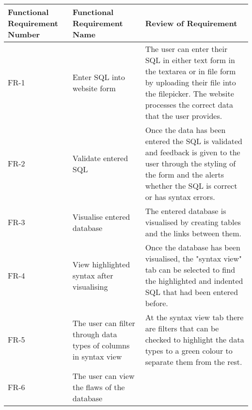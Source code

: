 \begin{center}
	\setlength\extrarowheight{2pt}
	\begin{tabularx}{\textwidth}{|X|X|X|}
		\hline
		\textbf{Functional Requirement Number} & \textbf{Functional Requirement Name} & \textbf{Review of Requirement} \\
		\hline
		FR-1 &  Enter SQL into website form & The user can enter their SQL in either text form in the textarea or in file form by uploading their file into the filepicker. The website processes the correct data that the user provides. \\
		\hline
		FR-2 & Validate entered SQL & Once the data has been entered the SQL is validated and feedback is given to the user through the styling of the form and the alerts whether the SQL is correct or has syntax errors. \\
		\hline
		FR-3 & Visualise entered database & The entered database is visualised by creating tables and the links between them.\\
		\hline
		FR-4 & View highlighted syntax after visualising & Once the database has been visualised, the "syntax view" tab can be selected to find the highlighted and indented SQL that had been entered before. \\
		\hline
		FR-5 & The user can filter through data types of columns in syntax view & At the syntax view tab there are filters that can be checked to highlight the data types to a green colour to separate them from the rest. \\
		\hline
		FR-6 & The user can view the flaws of the database & \\
		\hline
	\end{tabularx}
\end{center}